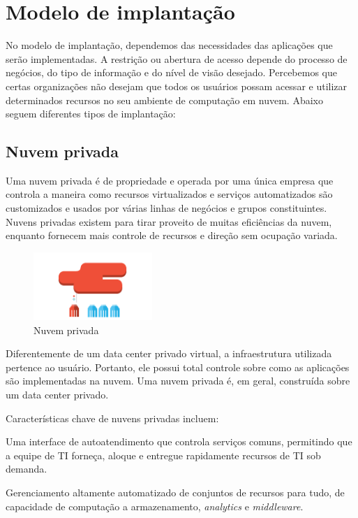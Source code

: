 \chapter{Modelo de implantação}

No modelo de implantação, dependemos das necessidades das aplicações que serão
implementadas. A restrição ou abertura de acesso depende do processo de negócios,
do tipo de informação e do nível de visão desejado. Percebemos que certas
organizações não desejam que todos os usuários possam acessar e utilizar
determinados recursos no seu ambiente de computação em nuvem. Abaixo seguem
diferentes tipos de implantação:

\section{Nuvem privada}

Uma nuvem privada é de propriedade e operada por uma única empresa que controla a
maneira como recursos virtualizados e serviços automatizados são customizados e
usados por várias linhas de negócios e grupos constituintes. Nuvens privadas existem
para tirar proveito de muitas eficiências da nuvem, enquanto fornecem mais controle
de recursos e direção sem ocupação variada.

\begin{figure}[ht]
    \centering
    \includegraphics[width=0.4\textwidth]{img/private.png}
    \caption{Nuvem privada}
    \label{img:privatecloud}
\end{figure}

Diferentemente de um data center privado virtual, a infraestrutura utilizada
pertence ao usuário. Portanto, ele possui total controle sobre como as aplicações
são implementadas na nuvem. Uma nuvem privada é, em geral, construída sobre um data
center privado.

Características chave de nuvens privadas incluem:

\begin{itemise}
    \item Uma interface de autoatendimento que controla serviços comuns, permitindo
        que a equipe de TI forneça, aloque e entregue rapidamente recursos de TI
        sob demanda. 
    \item Gerenciamento altamente automatizado de conjuntos de recursos para tudo,
        de capacidade de computação a armazenamento, \emph{analytics} e
        \emph{middleware}.
\end{itemise}

